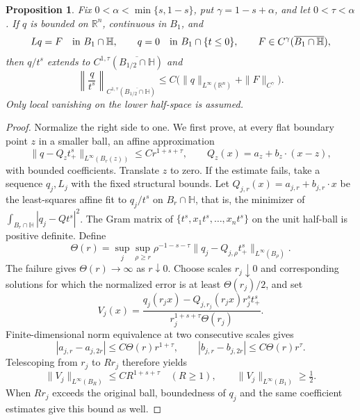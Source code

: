 \documentclass[11pt]{article}
\newtheorem{proposition}[theorem]{Proposition}
\numberwithin{equation}{section}
\newcommand{\R}{\mathbb R}
\newcommand{\Hh}{\mathbb H}
\begin{document}
\begin{proposition}\label{prop:flat-quotient}
Fix $0<\alpha<\min\{s,1-s\}$, put $\gamma=1-s+\alpha$, and let
$0<\tau<\alpha$. If $q$ is bounded on $\R^n$, continuous in $B_1$, and
\[
 Lq=F\quad\hbox{in }B_1\cap\Hh,\qquad
 q=0\quad\hbox{in }B_1\cap\{t\leq0\},
 \qquad F\in C^\gamma(\overline{B_1\cap\Hh}),
\]
then $q/t^s$ extends to $C^{1,\tau}(\overline{B_{1/2}\cap\Hh})$ and
\begin{equation}\label{eq:flat-quotient}
 \left\|\frac{q}{t^s}\right\|_{C^{1,\tau}(\overline{B_{1/2}\cap\Hh})}
     \leq C\bigl(\|q\|_{L^\infty(\R^n)}+\|F\|_{C^\gamma}\bigr).
\end{equation}
Only local vanishing on the lower half-space is assumed.
\end{proposition}

\begin{proof}
Normalize the right side to one. We first prove, at every flat boundary
point $z$ in a smaller ball, an affine approximation
\begin{equation}\label{eq:boundary-affine}
 \|q-Q_z t_+^s\|_{L^\infty(B_r(z))}\leq Cr^{1+s+\tau},
             \qquad Q_z(x)=a_z+b_z\cdot(x-z),
\end{equation}
with bounded coefficients. Translate $z$ to zero. If the estimate fails,
take a sequence $q_j,L_j$ with the fixed structural bounds. Let
$Q_{j,r}(x)=a_{j,r}+b_{j,r}\cdot x$ be the least-squares affine fit to
$q_j/t^s$ on $B_r\cap\Hh$, that is, the
minimizer of $\int_{B_r\cap\Hh}|q_j-Q t^s|^2$. The Gram matrix of
$\{t^s,x_1t^s,\ldots,x_nt^s\}$ on the unit half-ball is positive definite.
Define
\[
 \Theta(r)=\sup_j\sup_{\rho\geq r}
       \rho^{-1-s-\tau}\|q_j-Q_{j,\rho}t_+^s\|_{L^\infty(B_\rho)}.
\]
The failure gives $\Theta(r)\to\infty$ as $r\downarrow0$. Choose scales
$r_j\downarrow0$ and corresponding solutions for which the normalized
error is at least $\Theta(r_j)/2$, and set
\[
 V_j(x)=\frac{q_j(r_jx)-Q_{j,r_j}(r_jx)r_j^s t_+^s}
                  {r_j^{1+s+\tau}\Theta(r_j)}.
\]
Finite-dimensional norm equivalence at two consecutive scales gives
\[
 |a_{j,r}-a_{j,2r}|\leq C\Theta(r)r^{1+\tau},\qquad
 |b_{j,r}-b_{j,2r}|\leq C\Theta(r)r^\tau.
\]
Telescoping from $r_j$ to $Rr_j$ therefore yields
\begin{equation}\label{eq:Campanato-growth}
 \|V_j\|_{L^\infty(B_R)}\leq CR^{1+s+\tau}\quad(R\geq1),
 \qquad \|V_j\|_{L^\infty(B_1)}\geq\tfrac12.
\end{equation}
When $Rr_j$ exceeds the original ball, boundedness of $q_j$ and the same
coefficient estimates give this bound as well.


\end{proof}
\end{document}
